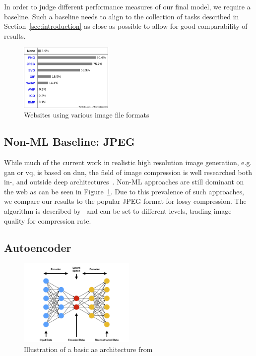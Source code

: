 In order to judge different performance measures of our final model, we require a baseline.
Such a baseline needs to align to the collection of tasks described in Section~\ref{sec:introduction} as close as
possible to allow for good comparability of results.

\begin{figure}
    \centering
    \vspace{-10pt}
    \includegraphics[width=0.4\textwidth]{images/formats}
    \vspace{-10pt}
    \caption{Websites using various image file formats~\cite{img_file_format}}
    \label{fig:file_formats}
\end{figure}

\subsection{Non-ML Baseline: JPEG}\label{subsec:jpeg}
While much of the current work in realistic high resolution image generation, e.g. \ac{gan} or \ac{vq}, is based on
\ac{dnn}, the field of image compression is well researched both in-, and outside deep architectures~\cite{compression}.
Non-ML approaches are still dominant on the web as can be seen in Figure~\ref{fig:file_formats}.
Due to this prevalence of such approaches, we compare our results to the popular JPEG format for lossy compression.
The algorithm is described by~\cite{jpeg} and can be set to different levels, trading image quality for compression
rate.

\subsection{Autoencoder}\label{subsec:autoencoder}
\begin{figure}
    \centering
    \includegraphics[width=0.5\textwidth]{images/ae}
    \caption{Illustration of a basic \ac{ae} architecture from~\cite{ae_pic}}
    \label{fig:ae}
\end{figure}


